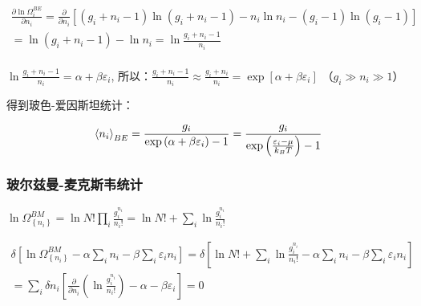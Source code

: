 $\begin{array}{l}
 \frac{{\partial \ln \Omega _i^{BE} }}{{\partial n_i }} = \frac{\partial }{{\partial n_i }}\left[ {\left( {g_i  + n_i  - 1} \right)\ln \left( {g_i  + n_i  - 1} \right) - n_i \ln n_i  - \left( {g_i  - 1} \right)\ln \left( {g_i  - 1} \right)} \right] \\
  = \ln \left( {g_i  + n_i  - 1} \right) - \ln n_i  = \ln \frac{{g_i  + n_i  - 1}}{{n_i }} \\
 \end{array}$


$\ln \frac{{g_i  + n_i  - 1}}{{n_i }} = \alpha  + \beta \varepsilon _i $, 所以：$\frac{{g_i  + n_i  - 1}}{{n_i }} \approx \frac{{g_i  + n_i }}{{n_i }} = \exp \left[ {\alpha  + \beta \varepsilon _i } \right]$
（$g_i  \gg n_i  \gg 1$）


得到玻色-爱因斯坦统计：

\begin{equation}\label{33-8}
\left\langle {n_i } \right\rangle _{BE}  = \frac{{g_i }}{{\exp \left( {\alpha  + \beta \varepsilon _i } \right) - 1}} = \frac{{g_i }}{{\exp \left( {{\textstyle{{\varepsilon _i  - \mu } \over {k_B T}}}} \right) - 1}}
\end{equation}




\subsubsection{玻尔兹曼-麦克斯韦统计}


$\ln \Omega _{\left\{ {n_i } \right\}}^{BM}  = \ln N!\prod\limits_i {\frac{{g_i ^{n_i } }}{{n_i !}}}  = \ln N! + \sum\limits_i {\ln \frac{{g_i ^{n_i } }}{{n_i !}}} $

$\begin{array}{l}
 \delta \left[ {\ln \Omega _{\left\{ {n_i } \right\}}^{BM}  - \alpha \sum\limits_i {n_i }  - \beta \sum\limits_i {\varepsilon _i n_i } } \right] = \delta \left[ {\ln N! + \sum\limits_i {\ln \frac{{g_i ^{n_i } }}{{n_i !}}}  - \alpha \sum\limits_i {n_i }  - \beta \sum\limits_i {\varepsilon _i n_i } } \right] \\
  = \sum\limits_i {\delta n_i \left[ {\frac{\partial }{{\partial n_i }}\left( {\ln \frac{{g_i ^{n_i } }}{{n_i !}}} \right) - \alpha  - \beta \varepsilon _i } \right]}  = 0 \\
 \end{array}$

